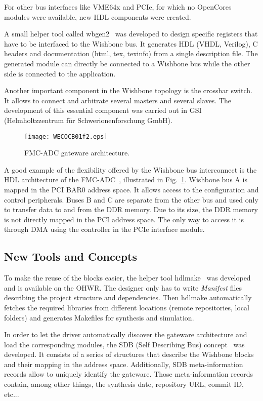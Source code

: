 \documentclass{JAC2003}
\begin{document}
For other bus interfaces like VME64x and PCIe, for which no OpenCores modules were available, new HDL components were created.

A small helper tool called wbgen2~\cite{wbgen2} was developed to design specific registers that have to be interfaced to the Wishbone bus.
It generates HDL (VHDL, Verilog), C headers and documentation (html, tex, texinfo) from a single description file.
The generated module can directly be connected to a Wishbone bus while the other side is connected to the application.

Another important component in the Wishbone topology is the crossbar switch.
It allows to connect and arbitrate several masters and several slaves.
The development of this essential component was carried out in GSI (Helmholtzzentrum f\"ur Schwerionenforschung GmbH).

\begin{figure}[htb]
   \centering
   \texttt{[image: WECOCB01f2.eps]}
   \caption{FMC-ADC gateware architecture.}
   \label{spec-fmc-adc_arch}
\end{figure}

A good example of the flexibility offered by the Wishbone bus interconnect is the HDL architecture of the FMC-ADC~\cite{fmc-adc}, illustrated in Fig.~\ref{spec-fmc-adc_arch}.
Wishbone bus A is mapped in the PCI BAR0 address space.
It allows access to the configuration and control peripherals.
Buses B and C are separate from the other bus and used only to transfer data to and from the DDR memory.
Due to its size, the DDR memory is not directly mapped in the PCI address space.
The only way to access it is through DMA using the controller in the PCIe interface module.

\subsection{New Tools and Concepts}
To make the reuse of the blocks easier, the helper tool hdlmake~\cite{hdlmake} was developed and is available on the OHWR.
The designer only has to write \textit{Manifest} files describing the project structure and dependencies.
Then hdlmake automatically fetches the required libraries from different locations (remote repositories, local folders) and generates Makefiles for synthesis and simulation.

In order to let the driver automatically discover the gateware architecture and load the corresponding modules, the SDB (Self Describing Bus) concept~\cite{sdb} was developed.
It consists of a series of structures that describe the Wishbone blocks and their mapping in the address space.
Additionally, SDB meta-information records allow to uniquely identify the gateware.
Those meta-information records contain, among other things, the synthesis date, repository URL, commit ID, etc...
\end{document}
